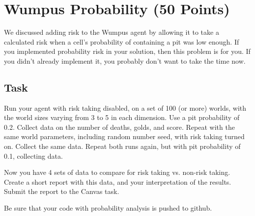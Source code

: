 \section*{Wumpus Probability (50 Points)}

We discussed adding risk to the Wumpus agent by
allowing it to take a calculated risk when a cell's
probability of containing a pit was low enough.
If you implemented probability risk in your solution,
then this problem is for you.  If you didn't already
implement it, you probably don't want to take the time
now.
  
\subsection*{Task}
  
Run your agent with risk taking disabled, on a set of
100 (or more) worlds, with the world sizes varying from
3 to 5 in each dimension.  Use a pit probability of 0.2.
Collect data on the number of deaths, golds, and score.
Repeat with the same world parameters, including random number seed,
with risk taking turned on.  Collect the same data.
Repeat both runs again, but with pit probability of 0.1, collecting data.

Now you have 4 sets of data to compare for risk taking vs. non-risk taking.
Create a short report with this data, and your interpretation of the
results.  Submit the report to the Canvas task.

Be sure that your code with probability analysis is pushed to github.
